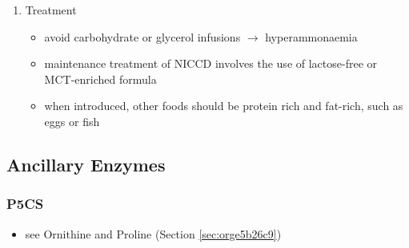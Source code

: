 \documentclass{scrartcl}
\begin{document}
\begin{enumerate}
\item Treatment
\label{sec:orgfd81b48}
\begin{itemize}
\item avoid carbohydrate or glycerol infusions \(\to\) hyperammonaemia
\item maintenance treatment of NICCD involves the use of lactose-free or
MCT-enriched formula
\item when introduced, other foods should be protein rich and fat-rich,
such as eggs or fish
\end{itemize}
\end{enumerate}
\subsection{Ancillary Enzymes}
\label{sec:org27229ad}
\subsubsection{P5CS}
\label{sec:org73735f1}
\begin{itemize}
\item see Ornithine and Proline (Section \ref{sec:orge5b26c9})
\end{itemize}
\end{document}
